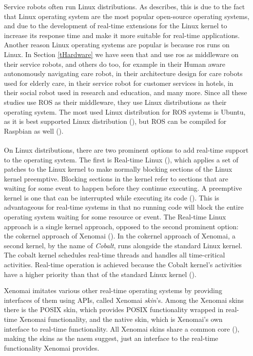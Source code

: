 \documentclass[12pt]{scrreprt}
\begin{document}
Service robots often run Linux distributions. As \citeauthor{delgado} describes, this is due to the fact that Linux operating system are the most popular open-source operating systems, and due to the development of real-time extensions for the Linux kernel to increase its response time and make it more suitable for real-time applications. Another reason Linux operating systems are popular is because \acrshort{ros} runs on Linux. In Section \ref{tHardware} we have seen that \cite{spencer} and \cite{delgado} use \acrshort{ros} as middleware on their service robots, and others do too, for example \cite{dimitris} in their Human aware autonomously navigating care robot, \cite{rosuser1} in their architecture design for care robots used for elderly care, \cite{intelligent_rosuser} in their service robot for customer services in hotels, \cite{rosbot_rosuser3} in their social robot used in research and education, and many more. Since all these studies use ROS as their middleware, they use Linux distributions as their operating system. The most used Linux distribution for ROS systems is Ubuntu, as it is best supported Linux distribution (\cite{foundation}), but ROS can be compiled for Raspbian as well (\cite{delgado}).
\\\\
On Linux distributions, there are two prominent options to add real-time support to the operating system. The first is Real-time Linux (\cite{rtwiki}), which applies a set of patches to the Linux kernel to make normally blocking sections of the Linux kernel preemptive. Blocking sections in the kernel refer to sections that are waiting for some event to happen before they continue executing. A preemptive kernel is one that can be interrupted while executing its code (\cite{blocking}). This is advantageous for real-time systems in that no running code will block the entire operating system waiting for some resource or event. The Real-time Linux approach is a single kernel approach, opposed to the second prominent option: the cokernel approach of Xenomai (\cite{xenomai}). In the cokernel approach of Xenomai, a second kernel, by the name of \textit{Cobalt}, runs alongside the standard Linux kernel. The cobalt kernel schedules real-time threads and handles all time-critical activities. Real-time operation is achieved because the Cobalt kernel's activities have a higher priority than that of the standard Linux kernel (\cite{xenomai}).
\par
Xenomai imitates various other real-time operating systems by providing interfaces of them using APIs, called Xenomai \textit{skin}'s. Among the Xenomai skins there is the POSIX skin, which provides POSIX functionality wrapped in real-time Xenomai functionality, and the native skin, which is Xenomai's own interface to real-time functionality. All Xenomai skins share a common core (\cite{faq}), making the skins as the naem suggest, just an interface to the real-time functionality Xenomai provides.
\end{document}

